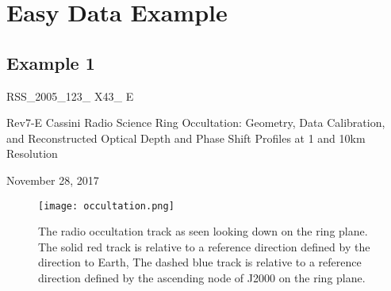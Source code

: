 \documentclass[crop=false,class=book]{standalone}
\begin{document}
\chapter{Easy Data Example}
\section{Example 1}
\begin{center}
    \LARGE{RSS\_2005\_123\_ X43\_ E \par
    Rev7-E Cassini Radio Science Ring Occultation: Geometry, Data Calibration, and Reconstructed Optical Depth and Phase Shift Profiles at 1 and 10km Resolution \par
    November 28, 2017\par}
\end{center}
\begin{figure}[H]
    \centering
    \hspace*{-0.5cm}\texttt{[image: occultation.png]}
    \caption*{The radio occultation track as seen looking down on the ring plane. The solid red track is relative to a reference direction defined by the direction to Earth, The dashed blue track is relative to a reference direction defined by the ascending node of J2000 on the ring plane.}
\end{figure}
\end{document}
